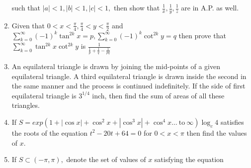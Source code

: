 \begin{enumerate}
  such that $|a| < 1, |b|< 1, |c| < 1,$ then show that $\frac{1}{x}, \frac{1}{y}, \frac{1}{z}$ are in A.P. as well.
\item Given that $0 < x< \frac{\pi}{4}, \frac{\pi}{4} < y <\frac{\pi}{2}$ and $\sum_{k=0}^\infty(-1)^k\tan^{2k}x = p,
  \sum_{k=0}^\infty(-1)^k\cot^{2k}y = q$ then prove that $\sum_{k = 0}^\infty \tan^{2k}x\cot^{2k}y$ is $\frac{1}{\frac{1}{p} +
    \frac{1}{q} - \frac{1}{pq}}$
\item An equilateral triangle is drawn by joining the mid-points of a given equilateral triangle. A third equilateral
  triangle is drawn inside the second in the same manner and the process is continued indefinitely. If the side of first
  equilateral triangle is $3^{1/4}$ inch, then find the sum of areas of all these triangles.
\item If $S = exp(1 + |\cos x| + \cos^2x + |\cos^3x| + \cos^4x \ldots~\text{to}~\infty)\log_c 4$ satisfies the roots of
  the equation $t^2 - 20t + 64 = 0$ for $0 < x< \pi$ then find the values of $x$.
\item If $S\subset (-\pi, \pi),$ denote the set of values of $x$ satisfying the equation


\end{enumerate}
